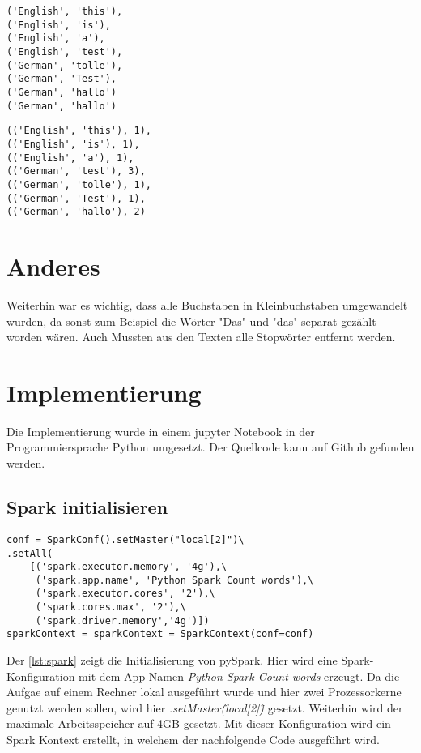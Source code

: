 \documentclass[chapterprefix=true, 12pt, a4paper, oneside, parskip=half, listof=totoc, bibliography=totoc, numbers=noendperiod]{scrbook}
\begin{document}
\begin{lstlisting}[caption={Wort-Sprache-Tupel}, captionpos=b, label={lst:wordLangTupel}]
('English', 'this'),
('English', 'is'),
('English', 'a'),
('English', 'test'),
('German', 'tolle'),
('German', 'Test'),
('German', 'hallo')
('German', 'hallo')
\end{lstlisting}

\begin{lstlisting}[caption={(Wort-Sprache)-Zähler-Tupel}, captionpos=b, label={lst:wordLangCountTrip}]
(('English', 'this'), 1),
(('English', 'is'), 1),
(('English', 'a'), 1),
(('German', 'test'), 3),
(('German', 'tolle'), 1),
(('German', 'Test'), 1),
(('German', 'hallo'), 2)
\end{lstlisting}

\section{Anderes}

Weiterhin war es wichtig, dass alle Buchstaben in Kleinbuchstaben umgewandelt wurden, da sonst zum Beispiel die Wörter "Das" und "das" separat gezählt worden wären. Auch Mussten aus den Texten alle Stopwörter entfernt werden.

\section{Implementierung}

Die Implementierung wurde in einem jupyter Notebook in der Programmiersprache Python umgesetzt. Der Quellcode kann auf Github gefunden werden. \cite{MAR20}
\subsection{Spark initialisieren}
\begin{lstlisting}[caption={Spark initialisieren}, captionpos=b, label={lst:spark}]
conf = SparkConf().setMaster("local[2]")\
.setAll(
    [('spark.executor.memory', '4g'),\
     ('spark.app.name', 'Python Spark Count words'),\
     ('spark.executor.cores', '2'),\
     ('spark.cores.max', '2'),\
     ('spark.driver.memory','4g')])
sparkContext = sparkContext = SparkContext(conf=conf) 
\end{lstlisting}

Der  \autoref{lst:spark} zeigt die Initialisierung von pySpark. Hier wird eine Spark-Konfiguration mit dem App-Namen \textit{Python Spark Count words} erzeugt. Da die Aufgae auf einem Rechner lokal ausgeführt wurde und hier zwei Prozessorkerne genutzt werden sollen, wird hier \textit{.setMaster(\"local[2]\")} gesetzt. Weiterhin wird der maximale Arbeitsspeicher auf 4GB gesetzt. Mit dieser Konfiguration wird ein Spark Kontext erstellt, in welchem der nachfolgende Code ausgeführt wird.
\end{document}
